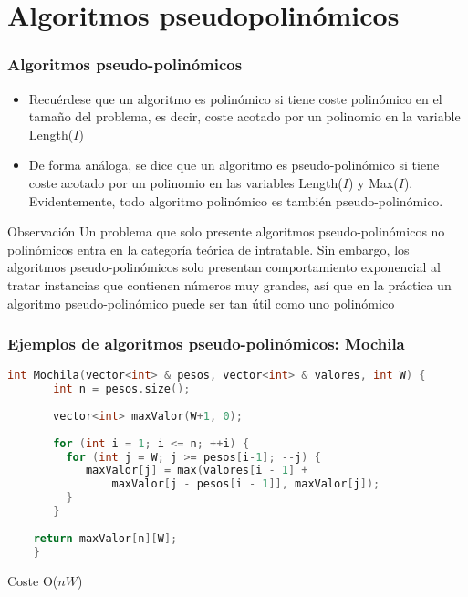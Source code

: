 \documentclass{beamer}
\begin{document}
\section{Algoritmos pseudopolinómicos}

\begin{frame}
	\frametitle{Algoritmos pseudo-polinómicos}
	\begin{itemize}
		\item Recuérdese que un algoritmo es \alert{polinómico} si tiene coste polinómico en el tamaño del problema, es decir, coste acotado por un polinomio en la variable Length($I$)
		\item De forma análoga, se dice que un algoritmo es \alert{pseudo-polinómico} si tiene coste acotado por un polinomio en las variables Length($I$) y Max($I$). Evidentemente, todo algoritmo polinómico es también pseudo-polinómico.
	\end{itemize}

   \begin{block}{Observación}
   	Un problema que solo presente algoritmos pseudo-polinómicos no polinómicos entra en la categoría teórica de intratable. Sin embargo, los algoritmos pseudo-polinómicos solo presentan comportamiento exponencial al tratar instancias que contienen números muy grandes, así que en la práctica un algoritmo pseudo-polinómico puede ser tan útil como uno polinómico
   \end{block}
\end{frame}

\begin{frame}[fragile]
	\frametitle{Ejemplos de algoritmos pseudo-polinómicos: Mochila}
	\begin{lstlisting}[language = C++, basicstyle=\ttfamily\scriptsize]
	int Mochila(vector<int> & pesos, vector<int> & valores, int W) {
	   int n = pesos.size();
	
	   vector<int> maxValor(W+1, 0);
	
	   for (int i = 1; i <= n; ++i) {
         for (int j = W; j >= pesos[i-1]; --j) {
	        maxValor[j] = max(valores[i - 1] + 
	            maxValor[j - pesos[i - 1]], maxValor[j]);
	     }
	   }
	
	return maxValor[n][W];
	}
	\end{lstlisting}
	
	Coste O($nW$)
\end{frame}
\end{document}
